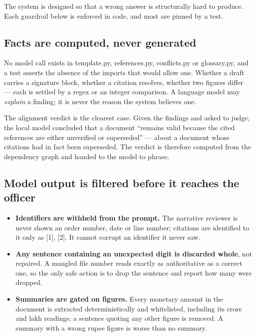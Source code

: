 \documentclass[11pt,a4paper]{article}
\newcommand{\code}[1]{{\mono\small #1}}
\begin{document}
The system is designed so that a wrong answer is structurally hard to produce. Each guardrail
below is enforced in code, and most are pinned by a test.

\subsection*{Facts are computed, never generated}

No model call exists in \code{template.py}, \code{references.py}, \code{conflicts.py} or
\code{glossary.py}, and a test asserts the absence of the imports that would allow one. Whether a
draft carries a signature block, whether a citation resolves, whether two figures differ --- each
is settled by a regex or an integer comparison. A language model may \emph{explain} a finding; it
is never the reason the system believes one.

The alignment verdict is the clearest case. Given the findings and asked to judge, the local
model concluded that a document ``remains valid because the cited references are either
unverified or superseded'' --- about a document whose citations had in fact been superseded. The
verdict is therefore computed from the dependency graph and handed to the model to phrase.

\subsection*{Model output is filtered before it reaches the officer}

\begin{itemize}[leftmargin=6mm,itemsep=1mm]
\item \textbf{Identifiers are withheld from the prompt.} The narrative reviewer is never shown an
      order number, date or line number; citations are identified to it only as \code{[1]},
      \code{[2]}. It cannot corrupt an identifier it never saw.
\item \textbf{Any sentence containing an unexpected digit is discarded whole}, not repaired. A
      mangled file number reads exactly as authoritative as a correct one, so the only safe
      action is to drop the sentence and report how many were dropped.
\item \textbf{Summaries are gated on figures.} Every monetary amount in the document is extracted
      deterministically and whitelisted, including its crore and lakh readings; a sentence quoting
      any other figure is removed. A summary with a wrong rupee figure is worse than no summary.
\end{itemize}
\end{document}
